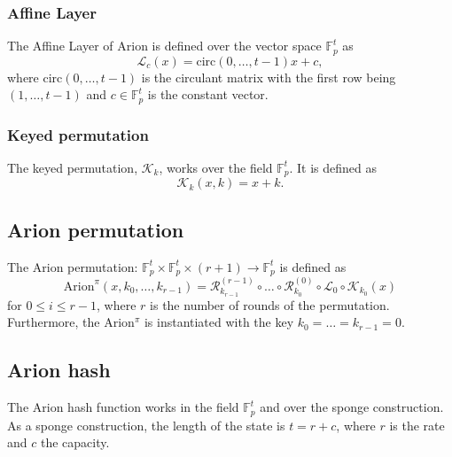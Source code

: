 \subsubsection*{Affine Layer}
The Affine Layer of Arion is defined over the vector space $\mathbb{F}_p^t$ as
\begin{equation}
    \mathcal{L}_c(x)=\text{circ}\left(0,\dots,t-1\right)x+c,
\end{equation}
where circ$\left(0,\dots,t-1\right)$ is the circulant matrix with the first row being $\left(1,\dots,t-1\right)$ and $c\in\mathbb{F}_p^t$ is the constant vector.

\subsubsection*{Keyed permutation}
The keyed permutation, $\mathcal{K}_k$, works over the field $\mathbb{F}_p^t$. It is defined as
\begin{equation}
    \mathcal{K}_k\left(x,k\right)=x+k.
\end{equation}

\subsection*{Arion permutation}
The Arion permutation: $\mathbb{F}_p^t\times\mathbb{F}_p^t\times\left(r+1\right)\rightarrow\mathbb{F}_p^t$ is defined as
\begin{equation}
    \text{Arion}^\pi(x,k_0,\dots,k_{r-1})=\mathcal{R}_{k_{r-1}}^{(r-1)}\circ\dots\circ\mathcal{R}_{k_0}^{(0)}\circ\mathcal{L}_0\circ\mathcal{K}_{k_0}(x)
\end{equation}
for $0\leq i\leq r-1$, where $r$ is the number of rounds of the permutation.\\
Furthermore, the Arion$^\pi$ is instantiated with the key $k_0=\dots=k_{r-1}=0$.

\subsection*{Arion hash}
The Arion hash function works in the field $\mathbb{F}_p^t$ and over the sponge construction. As a sponge construction, the length of the state is $t=r+c$, where $r$ is the rate and $c$ the capacity.